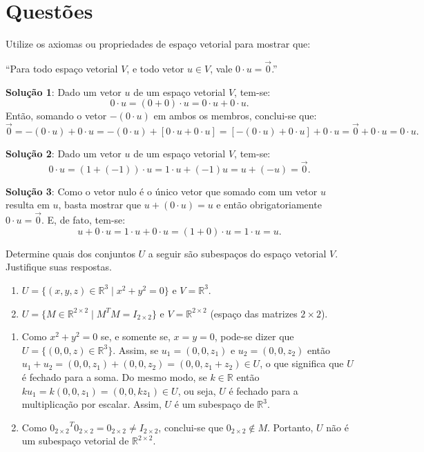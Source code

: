 \documentclass[12pt,a4paper]{article}
\newcommand*\R{\mathbb{R}}
\begin{document}
\section*{Questões}
\begin{ExerciseList}
\Exercise[title={2,0}] Utilize os axiomas ou propriedades de espaço vetorial para mostrar que:
\begin{center}
``Para todo espaço vetorial $V$, e todo vetor $u \in V$, vale $0 \cdot u = \vec{0}$.''
\end{center}
\Answer \textbf{Solução 1}: Dado um vetor $u$ de um espaço vetorial $V$, tem-se:
\[
0 \cdot u
= (0 + 0) \cdot u
= 0 \cdot u + 0 \cdot u.
\]
Então, somando o vetor $-(0 \cdot u)$ em ambos os membros, conclui-se que:
\[
\vec{0}
= -(0 \cdot u) + 0 \cdot u
= -(0 \cdot u) + [0 \cdot u + 0 \cdot u]
= [-(0 \cdot u) + 0 \cdot u] + 0 \cdot u
= \vec{0} + 0 \cdot u
= 0 \cdot u.
\]

\textbf{Solução 2}: Dado um vetor $u$ de um espaço vetorial $V$, tem-se:
\[
0 \cdot u
= (1 + (-1)) \cdot u
= 1 \cdot u + (-1) u
= u + (- u)
= \vec{0}.
\]

\textbf{Solução 3}: Como o vetor nulo é o único vetor que somado com um vetor $u$ resulta em $u$, basta mostrar que $u + (0 \cdot u) = u$ e então obrigatoriamente $0 \cdot u = \vec{0}$. E, de fato, tem-se:
\[
u + 0 \cdot u
= 1 \cdot u + 0 \cdot u
= (1 + 0) \cdot u
= 1 \cdot u
= u.
\]


\Exercise[title={2,0}] Determine quais dos conjuntos $U$ a seguir são subespaços do espaço vetorial $V$. Justifique suas respostas.
\begin{enumerate}
\item $U = \{ (x,y,z) \in \R^3 \mid x^2 + y^2 = 0 \}$ e $V = \R^3$.
\item $U = \{ M \in \R^{2 \times 2} \mid M^TM = I_{2\times2} \}$ e $V = \R^{2\times 2}$ (espaço das matrizes $2 \times 2$).
\end{enumerate}
\Answer
\begin{enumerate}
\item Como $x^2 + y^2 = 0$ se, e somente se, $x = y = 0$, pode-se dizer que $U = \{ (0,0,z) \in \R^3 \}$. Assim, se $u_1 = (0,0,z_1)$ e $u_2 = (0,0,z_2)$ então $u_1 + u_2 = (0,0,z_1) + (0,0,z_2) = (0,0,z_1+z_2) \in U$, o que significa que $U$ é fechado para a soma. Do mesmo modo, se $k \in \R$ então $k u_1 = k (0,0,z_1) = (0,0,kz_1) \in U$, ou seja, $U$ é fechado para a multiplicação por escalar. Assim, $U$ é um subespaço de $\R^3$.
\item Como ${0_{2\times 2}}^T 0_{2\times 2} = 0_{2\times 2} \neq I_{2 \times 2}$, conclui-se que $0_{2\times 2} \not\in M$. Portanto, $U$ não é um subespaço vetorial de $\R^{2 \times 2}$.
\end{enumerate}


\end{ExerciseList}
\end{document}
